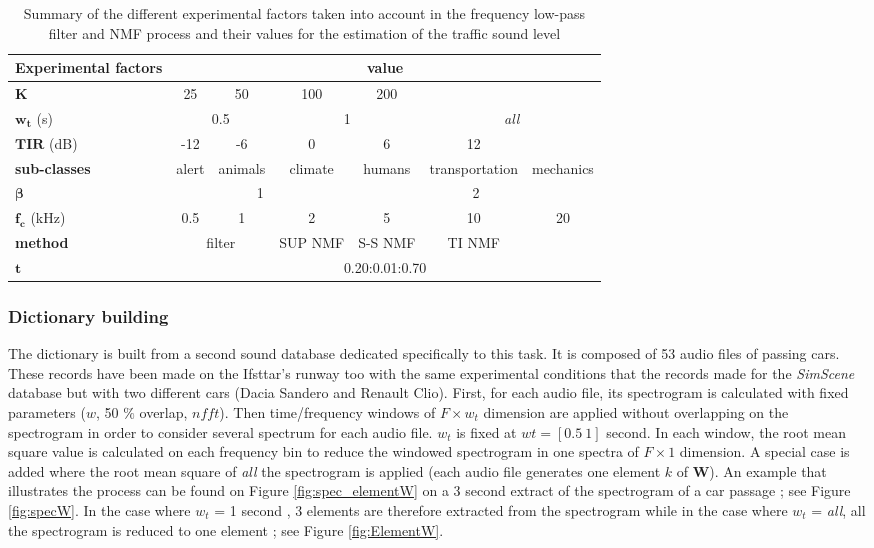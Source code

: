 \documentclass[twocolumn,a4paper,10pt]{article}
\begin{document}
\begin{table}[t]
\centering
\begin{tabular}{lcccccc}
\textbf{Experimental factors} &  \multicolumn{6}{c}{value}\\ \toprule
$\mathbf{K}$ & 25 & 50 & 100 & 200 & & \\
\rowcolor[HTML]{EFEFEF}
$\mathbf{w_t}$ (s)& \multicolumn{2}{c}{0.5} & \multicolumn{2}{c}{1}  & \multicolumn{2}{c}{\textit{all}} \\
$\mathbf{TIR}$ (dB) & -12 & -6 & 0 & 6 & 12 &  \\
\rowcolor[HTML]{EFEFEF}
\textbf{sub-classes} & alert & animals & climate & humans & transportation & mechanics \\
$\mathbf{\beta}$ & \multicolumn{3}{c}{1} & \multicolumn{3}{c}{2} \\
\rowcolor[HTML]{EFEFEF}
$\mathbf{f_c}$ (kHz) & 0.5 & 1 & 2 & 5 & 10 & 20 \\
\textbf{method} & \multicolumn{2}{c}{filter} & SUP NMF & S-S NMF & TI NMF \\
\rowcolor[HTML]{EFEFEF}
$\mathbf{t}$ & \multicolumn{6}{c}{0.20:0.01:0.70} \\ \bottomrule
\end{tabular}
\caption{Summary of the different experimental factors taken into account in the frequency low-pass filter and NMF process and their values for the estimation of the traffic sound level}
\label{tab:experimental_factors}
\end{table}


\subsubsection{Dictionary building}\label{part:dictionary_learning}

The dictionary is built from a second sound database dedicated specifically to this task. It is composed of 53 audio files of passing cars. These records have been made on the Ifsttar's runway too with the same experimental conditions that the records made for the \textit{SimScene} database but with two different cars (Dacia Sandero and Renault Clio). First, for each audio file, its spectrogram is calculated with fixed parameters ($w$, 50 $\%$ overlap, $nfft$). Then time/frequency windows of $F \times w_t $ dimension are applied without overlapping on the spectrogram in order to consider several spectrum for each audio file. $w_t$ is fixed at $wt = [0.5~1]$ second. In each window, the root mean square value is calculated on each frequency bin to reduce the windowed spectrogram in one spectra of $F \times 1$ dimension.  A special case is added where the root mean square of \textit{all} the spectrogram is applied (each audio file generates one element $k$ of $\mathbf{W}$). An example that illustrates the process can be found on Figure \ref{fig:spec_elementW} on a 3 second extract of the spectrogram of a car passage ; see Figure \ref{fig:specW}. In the case where $w_t$ = 1 second , 3 elements are therefore extracted from the spectrogram while in the case where $w_t$ = \textit{all}, all the spectrogram is reduced to one element ; see Figure \ref{fig:ElementW}.
\end{document}
